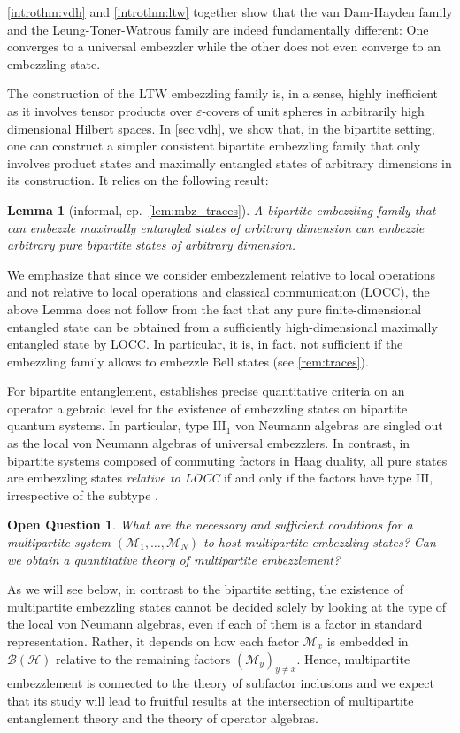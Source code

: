 \documentclass[a4paper, 10pt, onecolumn, accepted=2025-07-22]{quantumarticle}
\newtheorem{introlemma}[introtheorem]{Lemma}
\newtheorem*{introquestion}{Open Question}
\theoremstyle{definition}
\newcommand{\mc}{\mathcal}
\newcommand{\eps}{\varepsilon}
\newcommand{\III}{{\mathrm{III}}}
\def\B{{\mc B}}
\def\H{{\mc H}}
\def\M{{\mc M}}
\newcommand*{\1}{\text{\usefont{U}{bbold}{m}{n}1}}
\begin{document}
\cref{introthm:vdh} and \cref{introthm:ltw} together show that the van Dam-Hayden family and the Leung-Toner-Watrous family are indeed fundamentally different: One converges to a universal embezzler while the other does not even converge to an embezzling state.

The construction of the LTW embezzling family is, in a sense, highly inefficient as it involves tensor products over $\eps$-covers of unit spheres in arbitrarily high dimensional Hilbert spaces. In \cref{sec:vdh}, we show that, in the bipartite setting, one can construct a simpler consistent bipartite embezzling family that only involves product states and maximally entangled states of arbitrary dimensions in its construction. It relies on the following result:

\begin{introlemma}[informal, cp.~\cref{lem:mbz_traces}] A bipartite embezzling family that can embezzle maximally entangled states of arbitrary dimension can embezzle arbitrary pure bipartite states of arbitrary dimension.
\end{introlemma}

We emphasize that since we consider embezzlement relative to local operations and not relative to local operations and classical communication (LOCC), the above Lemma does not follow from the fact that any pure finite-dimensional entangled state can be obtained from a sufficiently high-dimensional maximally entangled state by LOCC.  
In particular, it is, in fact, not sufficient if the embezzling family allows to embezzle Bell states (see \cref{rem:traces}). 

For bipartite entanglement, \cite{long_paper} establishes precise quantitative criteria on an operator algebraic level for the existence of embezzling states on bipartite quantum systems. In particular, type $\III_{1}$ von Neumann algebras are singled out as the local von Neumann algebras of universal embezzlers. In contrast, in bipartite systems composed of commuting factors in Haag duality, all pure states are embezzling states \emph{relative to LOCC} if and only if the factors have type $\III$, irrespective of the subtype \cite{van_luijk_pure_2024}.
\begin{introquestion}
    What are the necessary and sufficient conditions for a multipartite system $(\M_1,\ldots,\M_N)$ to host multipartite embezzling states? Can we obtain a quantitative theory of multipartite embezzlement?
\end{introquestion}
As we will see below, in contrast to the bipartite setting, the existence of multipartite embezzling states cannot be decided solely by looking at the type of the local von Neumann algebras, even if each of them is a factor in standard representation. 
Rather, it depends on how each factor $\M_x$ is embedded in $\B(\H)$ relative to the remaining factors $(\M_y)_{y\neq x}$.
Hence, multipartite embezzlement is  connected to the theory of subfactor inclusions \cite{kawahigashi_subfactor_2005,longo_nets_1995,Jones_Sunder_1997} and we expect that its study will lead to fruitful results at the intersection of multipartite entanglement theory and the theory of operator algebras.
\end{document}
